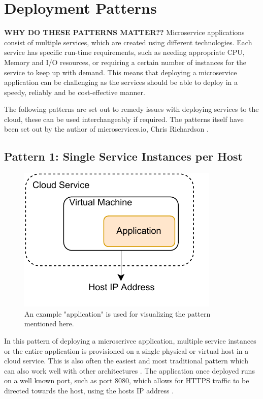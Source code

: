 \section{Deployment Patterns}
\textbf{WHY DO THESE PATTERNS MATTER?? }
Microservice applications consist of multiple services, which are created using different technologies. Each service has specific run-time requirements, such as needing appropriate CPU, Memory and I/O resources, or requiring a certain number of instances for the service to keep up with demand. This means that deploying a microservice application can be challenging as the services should be able to deploy in a speedy, reliably and be cost-effective manner. 

The following patterns are set out to remedy issues with deploying services to the cloud, these can be used interchangeably if required. The patterns itself have been set out by the author of microservices.io, Chris Richardson \cite{Chr19}. 

\subsection{Pattern 1: Single Service Instances per Host}
    \begin{figure}[H]
        \centering
        \includegraphics[width=0.45\linewidth]{images/Pattern-1.pdf}
        \caption{An example "application" is used for visualizing the pattern mentioned here.}
    \end{figure}  

In this pattern of deploying a microserivce application, multiple service instances or the entire application is provisioned on a single physical or virtual host in a cloud service. This is also often the easiest and most traditional pattern which can also work well with other architectures \citep{Chr19}. The application once deployed runs on a well known port, such as port 8080, which allows for HTTPS traffic to be directed towards the host, using the hosts IP address \citep{Chr19}. 

